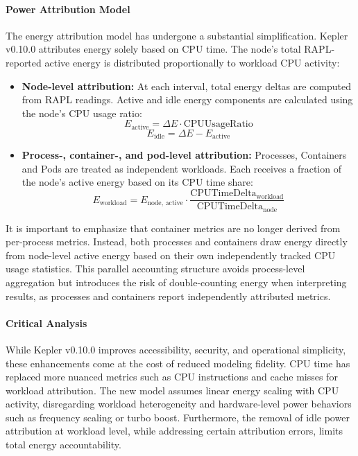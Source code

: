\paragraph{Power Attribution Model}

The energy attribution model has undergone a substantial simplification. Kepler v0.10.0 attributes energy solely based on CPU time. The node's total RAPL-reported active energy is distributed proportionally to workload CPU activity:

\begin{itemize}
    \item \textbf{Node-level attribution:} At each interval, total energy deltas are computed from RAPL readings. Active and idle energy components are calculated using the node's CPU usage ratio:
    \begin{equation}
        E_{\text{active}} = \Delta E \cdot \text{CPUUsageRatio}
    \end{equation}
    \begin{equation}
        E_{\text{idle}} = \Delta E - E_{\text{active}}
    \end{equation}

    \item \textbf{Process-, container-, and pod-level attribution:} Processes, Containers and Pods are treated as independent workloads. Each receives a fraction of the node's active energy based on its CPU time share:
    \begin{equation}
        E_{\text{workload}} = E_{\text{node, active}} \cdot \frac{\text{CPUTimeDelta}_{\text{workload}}}{\text{CPUTimeDelta}_{\text{node}}}
    \end{equation}
\end{itemize}

It is important to emphasize that container metrics are no longer derived from per-process metrics. Instead, both processes and containers draw energy directly from node-level active energy based on their own independently tracked CPU usage statistics. This parallel accounting structure avoids process-level aggregation but introduces the risk of double-counting energy when interpreting results, as processes and containers report independently attributed metrics.

\paragraph{Critical Analysis}

While Kepler v0.10.0 improves accessibility, security, and operational simplicity, these enhancements come at the cost of reduced modeling fidelity. CPU time has replaced more nuanced metrics such as CPU instructions and cache misses for workload attribution. The new model assumes linear energy scaling with CPU activity, disregarding workload heterogeneity and hardware-level power behaviors such as frequency scaling or turbo boost. Furthermore, the removal of idle power attribution at workload level, while addressing certain attribution errors, limits total energy accountability.

